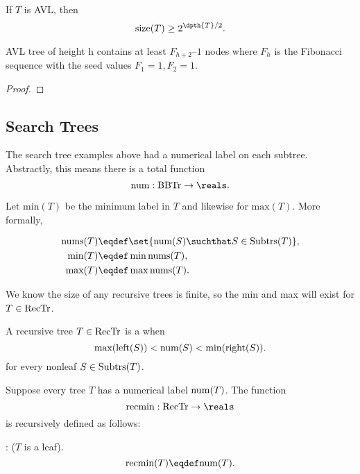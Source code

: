 \begin{definition}
\begin{lemma}\label{}
If $T$ is AVL, then
\[
\text{size}(T) \geq 2^{\dpth{T}/2}.
\]

\begin{editingnotes}
AVL tree of height h contains at least $F_{h+2} – 1$ nodes where $F_h$
is the Fibonacci sequence with the seed values $F_1 = 1, F_2 = 1$.
\end{editingnotes}

\begin{proof}
\end{proof}
\end{lemma}

\subsection{Search Trees}

The search tree examples above had a numerical label on each subtree.
Abstractly, this means there is a total function
\[
\nlbl{}:\brnch \to \reals.
\]

Let $\text{min}(T)$ be the minimum label in $T$ and likewise for
$\text{max}(T)$.  More formally,
\begin{definition}
\begin{align}
\text{nums}(T) & \eqdef \set{\nlbl{(S)} \suchthat S \in \subbrn{T}},\\
\text{min}(T) &\eqdef \min \text{nums}(T), \label{defminT}\\
\text{max}(T) &\eqdef \max \text{nums}(T).\label{defmaxT}
\end{align}
\end{definition}
We know the size of any recursive trees is finite, so the min and max
will exist for $T \in \text{RecTr}$.

\begin{definition}\label{defsearchtree}
A recursive tree $T \in \text{RecTr}$ is a  when
\begin{equation}\label{}
\text{max}(\text{left}(S)) < \text{num}(S) < \text{min}(\text{right}(S)).
\end{equation}
for every nonleaf $S \in \text{Subtrs}(T)$.
\end{definition}

\begin{problem}
Suppose every tree $T$ has a numerical label $\text{num}(T)$. The function
\[
\rmin{}: \rectr \to \reals
\]
is recursively defined as follows:

: ($T$ is a leaf).
\[
\rmin{(T)} \eqdef \nlbl{(T)}.
\]


\end{problem}
\end{definition}
